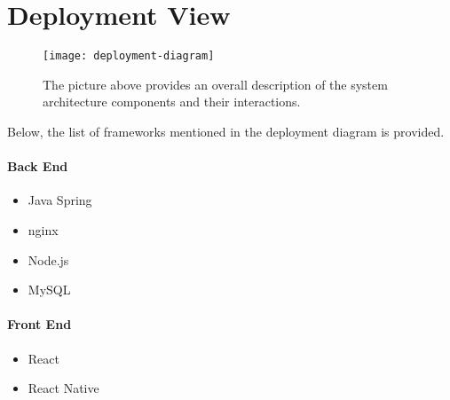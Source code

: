 \section{Deployment View}

\begin{figure}[H]
	\centering
	\texttt{[image: deployment-diagram]}
	\caption[Deployment Diagram]{The picture above provides an overall description of the system architecture components and their interactions.}
	\label{fig:deployment}
\end{figure}

Below, the list of frameworks mentioned in the deployment diagram is provided.

\paragraph{Back End}
\begin{itemize}
	\item Java Spring \cite{spring}
	\item nginx \cite{nginx}
	\item Node.js \cite{nodejs}
	\item MySQL {\cite{mysql}}
\end{itemize}

\paragraph{Front End}
\begin{itemize}
	\item React \cite{react}
	\item React Native \cite{react-native}
\end{itemize}
